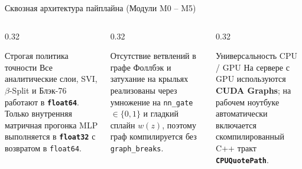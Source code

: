 \documentclass[aspectratio=169, 9pt]{beamer}
\begin{document}
\begin{frame}{Сквозная архитектура пайплайна (Модули M0 -- M5)}
  \vspace{0.25cm}
  \begin{columns}[T]
    \begin{column}{0.32\textwidth}
      \begin{block}{\scriptsize Строгая политика точности}
        \scriptsize Все аналитические слои, SVI, $\beta$-Split и Блэк-76 работают в \textbf{\texttt{float64}}. Только внутренняя матричная прогонка MLP выполняется в \textbf{\texttt{float32}} с возвратом в \texttt{float64}.
      \end{block}
    \end{column}
    \begin{column}{0.32\textwidth}
      \begin{block}{\scriptsize Отсутствие ветвлений в графе}
        \scriptsize Фоллбэк и затухание на крыльях реализованы через умножение на \texttt{nn\_gate} $\in \{0, 1\}$ и гладкий сплайн $w(z)$, поэтому граф компилируется без \texttt{graph\_breaks}.
      \end{block}
    \end{column}
    \begin{column}{0.32\textwidth}
      \begin{block}{\scriptsize Универсальность CPU / GPU}
        \scriptsize На сервере с GPU используются \textbf{CUDA Graphs}; на рабочем ноутбуке автоматически включается скомпилированный C++ тракт \textbf{\texttt{CPUQuotePath}}.
      \end{block}
    \end{column}
  \end{columns}
\end{frame}
\end{document}
